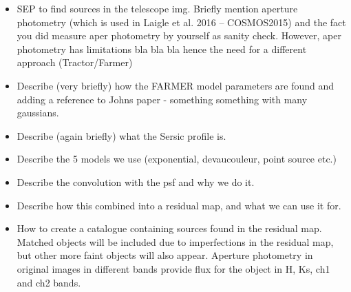 \begin{itemize}
    \item SEP to find sources in the telescope img. Briefly mention aperture photometry (which is used in Laigle et al. 2016 -- COSMOS2015) and the fact you did measure aper photometry by yourself as sanity check. However, aper photometry has limitations bla bla bla hence the need for a different approach (Tractor/Farmer)
    \item Describe (very briefly) how the FARMER model parameters are found and adding a reference to Johns paper - something something with many gaussians. 
    \item Describe (again briefly) what the Sersic profile is.
    \item Describe the 5 models we use (exponential, devaucouleur, point source etc.)
    \item Describe the convolution with the psf and why we do it.
    \item Describe how this combined into a residual map, and what we can use it for.
    \item How to create a catalogue containing sources found in the residual map. Matched objects will be included due to imperfections in the residual map, but other more faint objects will also appear. Aperture photometry in original images in different bands provide flux for the object in H, Ks, ch1 and ch2 bands.
\end{itemize}

